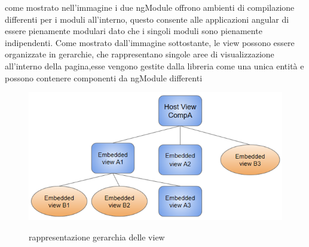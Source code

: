 come mostrato nell'immagine i due ngModule offrono ambienti di compilazione differenti per i moduli all'interno, questo consente alle applicazioni angular di essere pienamente modulari dato che i singoli moduli sono pienamente indipendenti.
\newline
Come mostrato dall'immagine sottostante, le view possono essere organizzate in gerarchie, che rappresentano singole aree di visualizzazione all'interno della pagina,esse vengono gestite dalla libreria come una unica entità e possono contenere componenti da ngModule differenti
\begin{figure}[H]
    \centering
\includegraphics[scale=1]{resources/view-hierarchy.png}
   \cite{angular-doc}
    \caption{rappresentazione gerarchia delle view}
\end{figure}
\newpage
